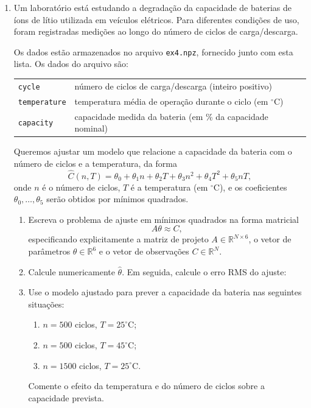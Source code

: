 \documentclass[a4paper,12pt]{article}
\begin{document}
\begin{enumerate}
\begin{enumerate}
        \item Compare o seu resultado com a lei de Moore, que afirma que o número de transistores por circuito integrado aproximadamente dobra a cada um ano e meio a dois anos.
\end{enumerate}
    \item Um laboratório está estudando a degradação da capacidade de baterias de íons de lítio utilizada em veículos elétricos. 
Para diferentes condições de uso, foram registradas medições ao longo do número de ciclos de carga/descarga.

Os dados estão armazenados no arquivo \texttt{ex4.npz}, fornecido junto com esta lista. Os dados do arquivo são:

\begin{center}
\begin{tabular}{l l}
\texttt{cycle}        & número de ciclos de carga/descarga (inteiro positivo) \\
\texttt{temperature}  & temperatura média de operação durante o ciclo (em $^\circ$C) \\
\texttt{capacity}     & capacidade medida da bateria (em \% da capacidade nominal) \\
\end{tabular}
\end{center}

Queremos ajustar um modelo que relacione a capacidade da bateria com o número de ciclos e a temperatura, da forma
\[
\hat{C}(n, T) 
= \theta_0 
+ \theta_1 n 
+ \theta_2 T 
+ \theta_3 n^2 
+ \theta_4 T^2 
+ \theta_5 nT,
\]
onde $n$ é o número de ciclos, $T$ é a temperatura (em $^\circ$C), e os coeficientes $\theta_0,\dots,\theta_5$ serão obtidos por mínimos quadrados.

\begin{enumerate}

    \item Escreva o problema de ajuste em mínimos quadrados na forma matricial
    \[
        A\theta \approx C,
    \]
    especificando explicitamente a matriz de projeto $A \in \mathbb{R}^{N \times 6}$, o vetor de parâmetros $\theta \in \mathbb{R}^6$ e o vetor de observações $C \in \mathbb{R}^N$.


    \item Calcule numericamente $\hat{\theta}$. Em seguida, calcule o erro RMS do ajuste:

    \item Use o modelo ajustado para prever a capacidade da bateria nas seguintes situações:
    \begin{enumerate}
        \item $n = 500$ ciclos, $T = 25^\circ$C;
        \item $n = 500$ ciclos, $T = 45^\circ$C;
        \item $n = 1500$ ciclos, $T = 25^\circ$C.
    \end{enumerate}
    Comente o efeito da temperatura e do número de ciclos sobre a capacidade prevista.


\end{enumerate}
\end{enumerate}
\end{document}

